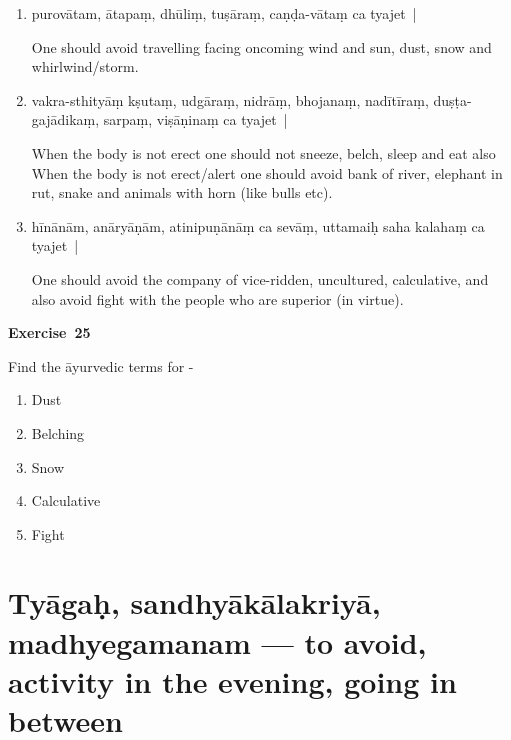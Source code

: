 \begin{enumerate}
\itemsep=0pt
\item {}

purovātam, ātapaṃ, dhūliṃ, tuṣāraṃ, caṇḍa-vātaṃ ca tyajet~|

One should avoid travelling facing oncoming wind and sun, dust, snow and whirlwind/storm.  

\item {}

vakra-sthityāṃ kṣutaṃ, udgāraṃ, nidrāṃ, bhojanaṃ, nadītīraṃ, duṣṭa-gajādikaṃ, sarpaṃ, viṣāṇinaṃ ca  tyajet~| 

When the body is not erect one should not sneeze, belch, sleep and eat  also When the body is not erect/alert one should avoid bank of river, elephant in rut, snake and animals with horn (like bulls etc).   

\item {}

hīnānām, anāryāṇām, atinipuṇānāṃ ca sevāṃ, uttamaiḥ saha kalahaṃ ca tyajet~| 

One should avoid the company of vice-ridden, uncultured, calculative, and also avoid fight with the people who are superior (in virtue).
\end{enumerate}

\centerline{\textbf{Exercise~25}}

Find the āyurvedic terms for -
\begin{enumerate}
\itemsep=0pt
\renewcommand{\theenumi}{\alph{enumi}}
\renewcommand{\labelenumi}{\theenumi.}
\item Dust
\item Belching
\item Snow
\item Calculative
\item Fight
\end{enumerate}

\chapter{Tyāgaḥ, sandhyākālakriyā, madhyegamanam --- to avoid, activity in the evening, going in between}

